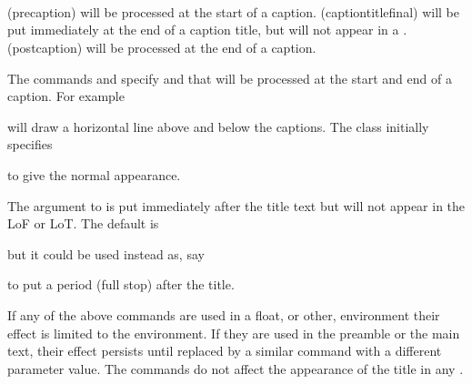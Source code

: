 \begin{syntax}
\cmd{\precaption} \\
\cmd{\captiontitlefinal} \\
\cmd{\postcaption} \\
\end{syntax}
\glossary(precaption)%
  {}%
  { will be processed at the start of a caption.}
\glossary(captiontitlefinal)%
  {}%
  { will be put immediately at the end of a caption title,
   but will not appear in a \listofx.}
\glossary(postcaption)%
  {}%
  { will be processed at the end of a caption.}

  The commands \cmd{\precaption} and  \cmd{\postcaption}
specify  and  that will be processed at the
start and end of a caption. For example 
\begin{lcode}
\precaption{\rule{\linewidth}{0.4pt}\par}
\postcaption{\rule{\linewidth}{0.4pt}}
\end{lcode}
  will draw a horizontal line above and below 
the captions.
The class initially specifies
\begin{lcode}
\precaption{}
\postcaption{}
\end{lcode}
to give the normal appearance.

    The argument to \cmd{\captiontitlefinal} is put immediately after the 
title text but will not appear in the LoF or LoT. The default is
\begin{lcode}
\captiontitlefinal{}
\end{lcode}
but it could be used instead as, say
\begin{lcode}
\end{lcode}
to put a period (full stop) after the title.
 
    If any of the above commands are used in a float, 
or other, environment their effect is limited to the environment. 
If they are used in the preamble
or the main text, their effect persists until replaced by a similar
command with a different parameter value. The commands do not affect the
appearance of the title in any \listofx.

